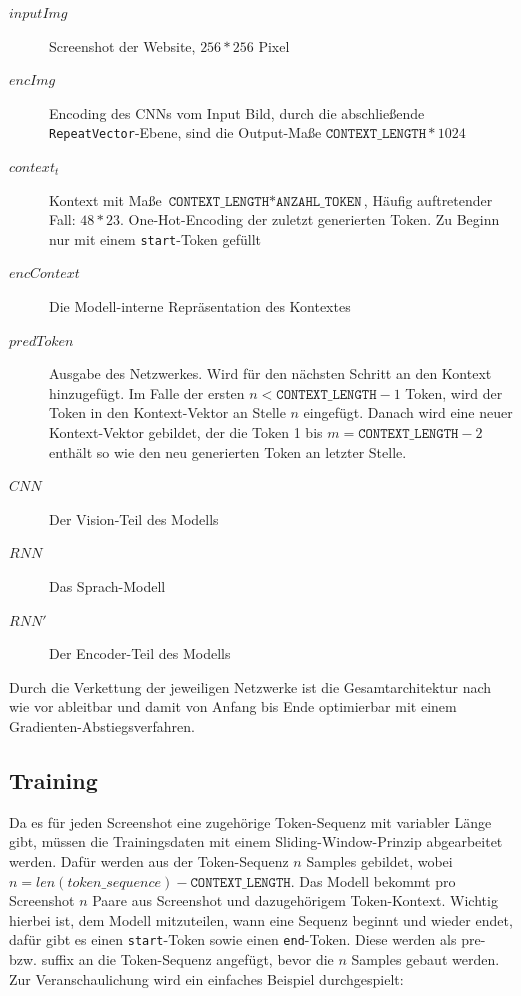 \documentclass[pdftex,a4paper,halfparskip, article]{scrartcl}
\begin{document}
\begin{description}
	\item[$inputImg$] Screenshot der Website, $256 * 256$ Pixel
	\item[$encImg$] Encoding des CNNs vom Input Bild, durch die abschließende \texttt{RepeatVector}-Ebene, sind die Output-Maße $\texttt{CONTEXT\_LENGTH} * 1024$
	
	\item[$context_t$] Kontext mit Maße $\texttt{CONTEXT\_LENGTH} * \texttt{ANZAHL\_TOKEN}$, Häufig auftretender Fall: $48 * 23$. One-Hot-Encoding der zuletzt generierten Token. Zu Beginn nur mit einem \texttt{start}-Token gefüllt
	
	\item[$encContext$] Die Modell-interne Repräsentation des Kontextes
	\item[$predToken$] Ausgabe des Netzwerkes. Wird für den nächsten Schritt an den Kontext hinzugefügt. Im Falle der ersten $n < \texttt{CONTEXT\_LENGTH} - 1$ Token, wird der Token in den Kontext-Vektor an Stelle $n$ eingefügt. Danach wird eine neuer Kontext-Vektor gebildet, der die Token 1 bis $m = \texttt{CONTEXT\_LENGTH} - 2 $ enthält so wie den neu generierten Token an letzter Stelle. 
	\\
	\item[$CNN$] Der Vision-Teil des Modells
	\item[$RNN$] Das Sprach-Modell
	\item[$RNN'$] Der Encoder-Teil des Modells
\end{description}

Durch die Verkettung der jeweiligen Netzwerke ist die Gesamtarchitektur nach wie vor ableitbar und damit von Anfang bis Ende optimierbar mit einem Gradienten-Abstiegsverfahren.

\subsection{Training}\label{sub:training}

Da es für jeden Screenshot eine zugehörige Token-Sequenz mit variabler Länge gibt, müssen die Trainingsdaten mit einem Sliding-Window-Prinzip abgearbeitet werden. Dafür werden aus der Token-Sequenz $n$ Samples gebildet, wobei $n = len(token\_sequence) - \texttt{CONTEXT\_LENGTH}$. Das Modell bekommt pro Screenshot $n$ Paare aus Screenshot und dazugehörigem Token-Kontext. Wichtig hierbei ist, dem Modell mitzuteilen, wann eine Sequenz beginnt und wieder endet, dafür gibt es einen \texttt{start}-Token sowie einen \texttt{end}-Token. Diese werden als pre- bzw. suffix an die Token-Sequenz angefügt, bevor die $n$ Samples gebaut werden. Zur Veranschaulichung wird ein einfaches Beispiel durchgespielt:
\end{document}
